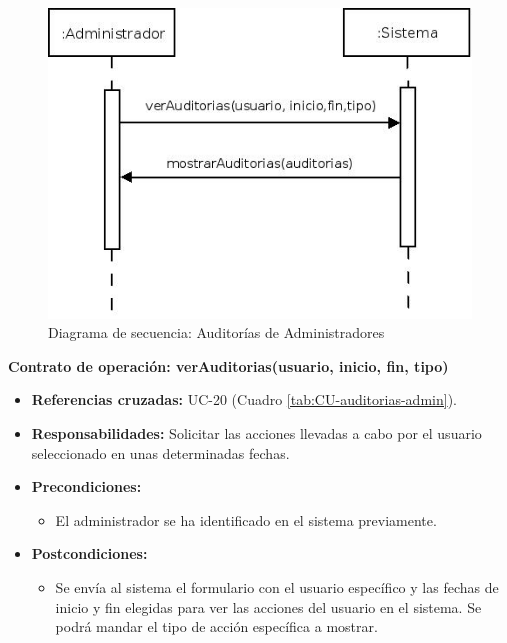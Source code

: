 \begin{figure}[H]
\centering
  \includegraphics[scale=.55]{img/secuencias/auditorias-administrador.jpeg}
  \caption{Diagrama de secuencia: Auditorías de Administradores}
  \label{fig:secuencia-auditorias-administrador}
\end{figure}

\textbf{Contrato de operación: verAuditorias(usuario, inicio, fin, tipo)}
\begin{itemize}
\item \textbf{Referencias cruzadas:} UC-20 (Cuadro \ref{tab:CU-auditorias-admin}).
\item \textbf{Responsabilidades:} Solicitar las acciones llevadas a cabo por el usuario seleccionado en unas determinadas fechas.
\item \textbf{Precondiciones:} 
 \begin{itemize}
\item El administrador se ha identificado en el sistema previamente.
\end {itemize}
\item \textbf{Postcondiciones:} 
 \begin{itemize}
\item Se envía al sistema el formulario con el usuario específico y las fechas de inicio y fin elegidas para ver las acciones del usuario en el sistema. Se podrá mandar el tipo de acción específica a mostrar.
\end {itemize}
\end {itemize}

